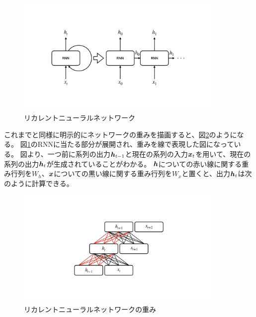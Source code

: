 \begin{figure}[htbp]
 \centering
 \includegraphics[trim = 0 200 0 200, width=0.9\textwidth, clip]{Figure/2DeepLearning/7RecurrentNeuralNetwork.png}
 \caption{リカレントニューラルネットワーク}
 \label{7RecurrentNeuralNetwork}
\end{figure}

これまでと同様に明示的にネットワークの重みを描画すると、図\ref{8RNNWeight}のようになる。
図\ref{7RecurrentNeuralNetwork}のRNNに当たる部分が展開され、重みを線で表現した図になっている。
図より、一つ前に系列の出力${\mbox{\boldmath{$h$}}}_{t-1}$と現在の系列の入力${\mbox{\boldmath{$x$}}}_t$を用いて、現在の系列の出力${\mbox{\boldmath{$h$}}}_t$が生成されていることがわかる。
${\mbox{\boldmath{$h$}}}$についての赤い線に関する重み行列を$W_h$、${\mbox{\boldmath{$x$}}}$についての黒い線に関する重み行列を$W_x$と置くと、出力${\mbox{\boldmath{$h$}}}_t$は次のように計算できる。

\begin{figure}[htbp]
 \centering
 \includegraphics[trim = 0 200 0 200, width=0.9\textwidth, clip]{Figure/2DeepLearning/8RNNWeight.png}
 \caption{リカレントニューラルネットワークの重み}
 \label{8RNNWeight}
\end{figure}

